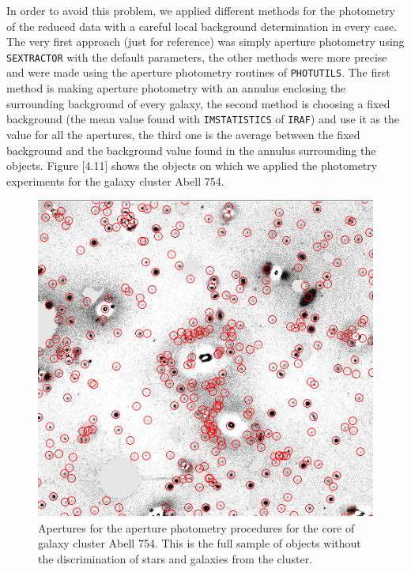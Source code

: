 In order to avoid this problem, we applied different methods for the photometry of the reduced data with a careful local background determination in every case. The very first approach (just for reference) was simply aperture photometry using \texttt{SEXTRACTOR} with the default parameters, the other methods were more precise and were made using the aperture photometry routines of \texttt{PHOTUTILS}. The first method is making aperture photometry with an annulus enclosing the surrounding background of every galaxy, the second method is choosing a fixed background (the mean value found with \texttt{IMSTATISTICS} of \texttt{IRAF}) and use it as the value for all the apertures, the third one is the average between the fixed background and the background value found in the annulus surrounding the objects. Figure [4.11] shows the objects on which we applied the photometry experiments for the galaxy cluster Abell 754.

\begin{figure}[H]
\centering
\includegraphics[width=15cm]{images/aperture_photometry.png}
\caption[Apertures for the aperture photometry procedures on Abell 754]{Apertures for the aperture photometry procedures for the core of galaxy cluster Abell 754. This is the full sample of objects without the discrimination of stars and galaxies from the cluster.}
\end{figure}

